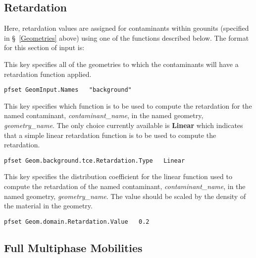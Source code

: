 \subsection{Retardation}
\label{Retardation}

Here, retardation values are assigned for contaminants within
geounits (specified in \S~\ref{Geometries} above) using one of
the functions described below.  The format for this section of
input is:

{
This key specifies all of the geometries to which the contaminants will
have a retardation function applied.
}
\begin{display}\begin{verbatim}
pfset GeomInput.Names   "background"
\end{verbatim}\end{display}

{
This key specifies which function is to be used to compute the
retardation for the named contaminant, {\em contaminant\_name}, in the
named geometry, {\em geometry\_name}.  The only choice currently
available is {\bf Linear} which indicates that a simple linear
retardation function is to be used to compute the retardation.
}
\begin{display}\begin{verbatim}
pfset Geom.background.tce.Retardation.Type   Linear
\end{verbatim}\end{display}

{
This key specifies the distribution coefficient for the linear function
used to compute the retardation of the named contaminant,
{\em contaminant\_name}, in the named geometry, {\em geometry\_name}.
The value should be scaled by the density of the material in the
geometry.
}
\begin{display}\begin{verbatim}
pfset Geom.domain.Retardation.Value   0.2
\end{verbatim}\end{display}


\subsection{Full Multiphase Mobilities}

